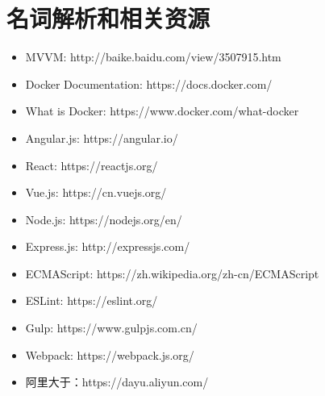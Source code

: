 \chapter{名词解析和相关资源}

\begin{itemize}
  \item MVVM: http://baike.baidu.com/view/3507915.htm
  \item Docker Documentation: https://docs.docker.com/
  \item What is Docker: https://www.docker.com/what-docker
  \item Angular.js: https://angular.io/
  \item React: https://reactjs.org/
  \item Vue.js: https://cn.vuejs.org/
  \item Node.js: https://nodejs.org/en/
  \item Express.js: http://expressjs.com/
  \item ECMAScript: https://zh.wikipedia.org/zh-cn/ECMAScript
  \item ESLint: https://eslint.org/
  \item Gulp: https://www.gulpjs.com.cn/
  \item Webpack: https://webpack.js.org/
  \item 阿里大于：https://dayu.aliyun.com/
\end{itemize}

